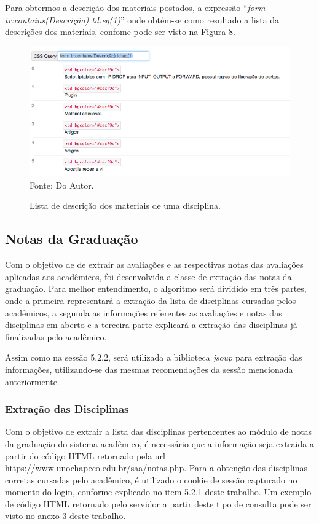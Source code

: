 Para obtermos a descrição dos materiais postados, a expressão ``\emph{form tr:contains(Descrição) td:eq(1)}'' onde obtém-se como resultado a lista da descrições dos materiais, confome pode ser visto na Figura 8.

\begin{figure}[!htb]
     \centering
     \caption[Extração de Informações - Lista das descrições dos materiais]{Lista de descrição dos materiais de uma disciplina.}
     \includegraphics[scale=0.6]{imagens/listamateriaisdisciplinasdescricao.png}
     \\  Fonte: Do Autor.
\end{figure}

\newpage

\subsection{Notas da Graduação}
Com o objetivo de de extrair as avaliações e as respectivas notas das avaliações aplicadas aos acadêmicos, foi desenvolvida a classe de extração das notas da graduação. Para melhor entendimento, o algoritmo será dividido em três partes, onde a primeira representará a extração da lista de disciplinas cursadas pelos acadêmicos, a segunda as informações referentes as avaliações e notas das disciplinas em aberto e a terceira parte explicará a extração das disciplinas já finalizadas pelo acadêmico.

Assim como na sessão 5.2.2, será utilizada a biblioteca \emph{jsoup} para extração das informações, utilizando-se das mesmas recomendações da sessão mencionada anteriormente.

\subsubsection{Extração das Disciplinas}
Com o objetivo de extrair a lista das disciplinas pertencentes ao módulo de notas da graduação do sistema acadêmico, é necessário que a informação seja extraida a partir do código HTML retornado pela url \url{https://www.unochapeco.edu.br/saa/notas.php}. Para a obtenção das disciplinas corretas cursadas pelo acadêmico, é utilizado o cookie de sessão capturado no momento do login, conforme explicado no item 5.2.1 deste trabalho. Um exemplo de código HTML retornado pelo servidor a partir deste tipo de consulta pode ser visto no anexo 3 deste trabalho.

